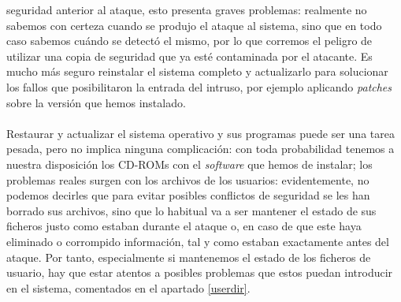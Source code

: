 seguridad anterior al ataque, esto presenta graves problemas: realmente no
sabemos con certeza cuando se produjo el ataque al sistema, sino que en todo
caso sabemos cu\'ando se detect\'o el mismo, por lo que corremos el peligro de
utilizar una copia de seguridad que ya est\'e contaminada por el atacante. Es
mucho m\'as seguro reinstalar el sistema completo y actualizarlo para solucionar
los fallos que posibilitaron la entrada del intruso, por ejemplo aplicando 
{\it patches} sobre la versi\'on que hemos instalado.\\
\\Restaurar y actualizar el sistema operativo y sus programas puede ser una
tarea pesada, pero no implica ninguna complicaci\'on: con toda probabilidad 
tenemos a nuestra disposici\'on los CD-ROMs con el {\it software} que hemos
de instalar; los problemas reales 
surgen con los archivos de los usuarios: evidentemente, no podemos decirles que
para evitar posibles conflictos de seguridad se les han borrado sus archivos, 
sino que lo habitual va a ser mantener el estado de sus ficheros justo como
estaban durante el ataque o, en caso de que este haya eliminado o corrompido
informaci\'on, tal y como estaban exactamente antes del ataque. Por tanto, 
especialmente si mantenemos el estado de los ficheros de usuario, hay que
estar atentos a posibles problemas que estos puedan introducir en el sistema,
comentados en el apartado \ref{userdir}.\\
